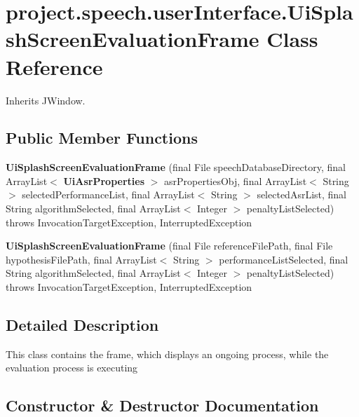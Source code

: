 \section{project.\+speech.\+user\+Interface.\+Ui\+Splash\+Screen\+Evaluation\+Frame Class Reference}
\label{classproject_1_1speech_1_1user_interface_1_1_ui_splash_screen_evaluation_frame}


Inherits J\+Window.

\subsection*{Public Member Functions}
\begin{DoxyCompactItemize}
\item 
{\bf Ui\+Splash\+Screen\+Evaluation\+Frame} (final File speech\+Database\+Directory, final Array\+List$<$ {\bf Ui\+Asr\+Properties} $>$ asr\+Properties\+Obj, final Array\+List$<$ String $>$ selected\+Performance\+List, final Array\+List$<$ String $>$ selected\+Asr\+List, final String algorithm\+Selected, final Array\+List$<$ Integer $>$ penalty\+List\+Selected)  throws Invocation\+Target\+Exception, Interrupted\+Exception  
\item 
{\bf Ui\+Splash\+Screen\+Evaluation\+Frame} (final File reference\+File\+Path, final File hypothesis\+File\+Path, final Array\+List$<$ String $>$ performance\+List\+Selected, final String algorithm\+Selected, final Array\+List$<$ Integer $>$ penalty\+List\+Selected)  throws Invocation\+Target\+Exception, Interrupted\+Exception  
\end{DoxyCompactItemize}


\subsection{Detailed Description}
This class contains the frame, which displays an ongoing process, while the evaluation process is executing 

\subsection{Constructor \& Destructor Documentation}
